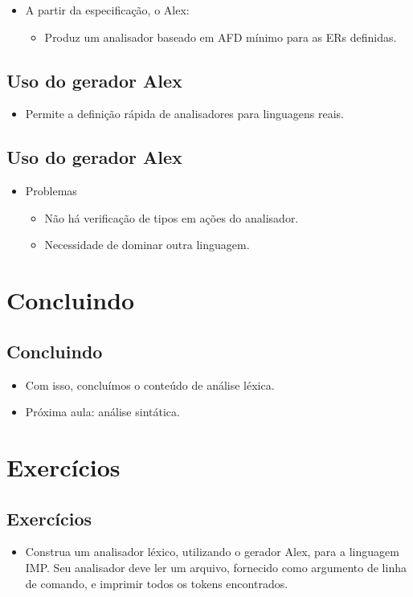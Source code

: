 \documentclass[11pt]{article}
\begin{document}
\begin{itemize}
\item A partir da especificação, o Alex:
\begin{itemize}
\item Produz um analisador baseado em AFD mínimo para as ERs definidas.
\end{itemize}
\end{itemize}
\subsection*{Uso do gerador Alex}
\label{sec:org7ecf72f}

\begin{itemize}
\item Permite a definição rápida de analisadores para linguagens reais.
\end{itemize}
\subsection*{Uso do gerador Alex}
\label{sec:org0446292}

\begin{itemize}
\item Problemas
\begin{itemize}
\item Não há verificação de tipos em ações do analisador.
\item Necessidade de dominar outra linguagem.
\end{itemize}
\end{itemize}
\section*{Concluindo}
\label{sec:org6c6e864}

\subsection*{Concluindo}
\label{sec:orgdd7b795}

\begin{itemize}
\item Com isso, concluímos o conteúdo de análise léxica.

\item Próxima aula: análise sintática.
\end{itemize}
\section*{Exercícios}
\label{sec:org064b244}

\subsection*{Exercícios}
\label{sec:org5a0e463}

\begin{itemize}
\item Construa um analisador léxico, utilizando o gerador Alex,  para a linguagem IMP.
Seu analisador deve ler um arquivo, fornecido como argumento de linha
de comando, e imprimir todos os tokens encontrados.
\end{itemize}
\end{document}
